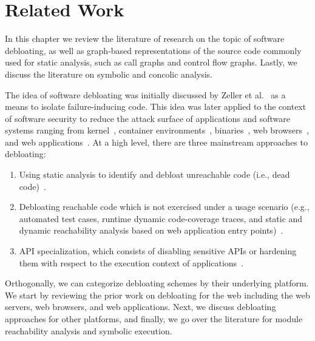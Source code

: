 \chapter{Related Work}
\label{chap:relatedwork}

In this chapter we review the literature of research on the topic of software debloating, as well as graph-based representations of the source code commonly used for static analysis, such as call graphs and control flow graphs. 
Lastly, we discuss the literature on symbolic and concolic analysis. 

The idea of software debloating was initially discussed by Zeller et al.~\cite{zeller2002simplifying} as a means to isolate failure-inducing code. 
This idea was later applied to the context of software security to reduce the attack surface of applications and software systems ranging from kernel~\cite{abubakar2021shard}, container environments~\cite{rastogi2017Cimplifier,259711}, binaries~\cite{hasan2022decap, redini2019b, heo2018effective,ghavamnia2020temporal, mishra2020saffire, koo2019configuration, quach2018debloating}, web browsers~\cite{snyder2017most, qian2020slimium}, and web applications~\cite{azad2019less, bulekov2021saphire, mininode, jahanshahi2020you}. 
At a high level, there are three mainstream approaches to debloating: 

\begin{enumerate}
    \item Using static analysis to identify and debloat unreachable code (i.e., dead code)~\cite{redini2019b, snyder2017most, quach2018debloating, mininode, 255308}.
    \item Debloating reachable code which is not exercised under a usage scenario (e.g., automated test cases, runtime dynamic code-coverage traces, and static and dynamic reachability analysis based on web application entry points)~\cite{lessismore, heo2018effective,qian2020slimium, koo2019configuration}.
    \item API specialization, which consists of disabling sensitive APIs or hardening them with respect to the execution context of applications~\cite{mishra2020saffire, saphire, jahanshahi2020you, mishra2021sgxpecial}. 
\end{enumerate}

Orthogonally, we can categorize debloating schemes by their underlying platform. 
We start by reviewing the prior work on debloating for the web including the web servers, web browsers, and web applications. 
Next, we discuss debloating approaches for other platforms, and finally, we go over the literature for module reachability analysis and symbolic execution. 


